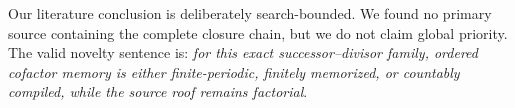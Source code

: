 Our literature conclusion is deliberately search-bounded.  We found no
primary source containing the complete closure chain, but we do not claim
global priority.  The valid novelty sentence is: \emph{for this exact
successor--divisor family, ordered cofactor memory is either
finite-periodic, finitely memorized, or countably compiled, while the
source roof remains factorial}.
